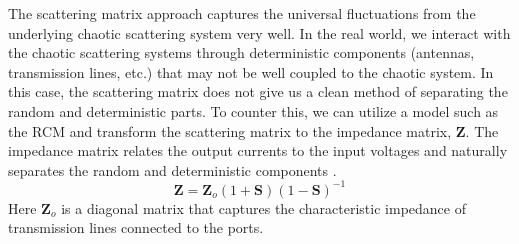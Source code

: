 The scattering matrix approach captures the universal fluctuations from the underlying chaotic scattering system very well. In the real world, we interact with the chaotic scattering systems through deterministic components (antennas, transmission lines, etc.) that may not be well coupled to the chaotic system. In this case, the scattering matrix does not give us a clean method of separating the random and deterministic parts. To counter this, we can utilize a model such as the RCM and transform the scattering matrix to the impedance matrix, $\textbf{Z}$. The impedance matrix relates the output currents to the input voltages \cite{yeh_first_principles} and naturally separates the random and deterministic components \cite{zheng_single}.
\begin{equation}
\textbf{Z} = \textbf{Z}_o(1+\textbf{S})(1-\textbf{S})^{-1}
\label{rmt_eq:3}
\end{equation}
\renewcommand{\baselinestretch}{2} \small\normalsize
Here $\textbf{Z}_o$ is a diagonal matrix that captures the characteristic impedance of transmission lines connected to the ports.